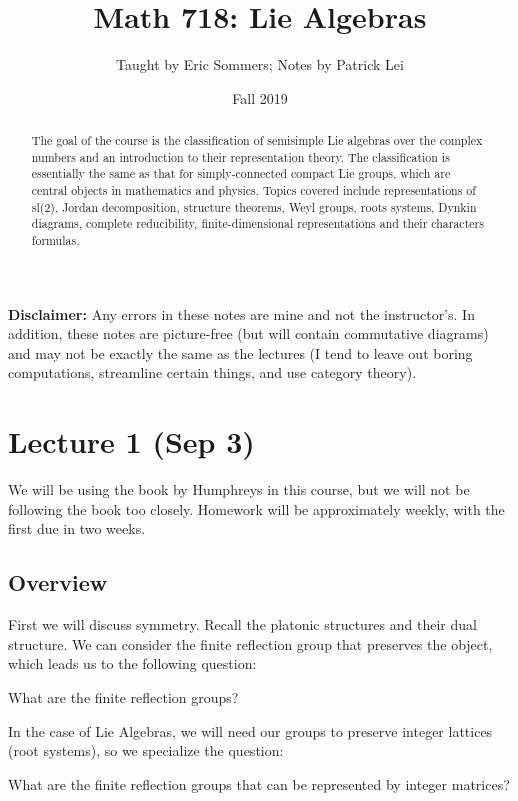 \documentclass[twoside, 10pt]{article}
\title{Math 718: Lie Algebras}
\author{Taught by Eric Sommers; Notes by Patrick Lei}
\affil{University of Massachusetts, Amherst}
\date{Fall 2019}
\begin{document}
    \maketitle\thispagestyle{firstpage}
    
    \begin{abstract}
        The goal of the course is the classification of semisimple Lie algebras over the complex numbers and an introduction to their representation theory. The classification is essentially the same as that for simply-connected compact Lie groups, which are central objects in mathematics and physics. Topics covered include representations of sl(2), Jordan decomposition, structure theorems, Weyl groups, roots systems, Dynkin diagrams, complete reducibility, finite-dimensional representations and their characters formulas.
    \end{abstract}

    \tableofcontents

    \textbf{Disclaimer:} Any errors in these notes are mine and not the instructor's. In addition, these notes are picture-free (but will contain commutative diagrams) and may not be exactly the same as the lectures (I tend to leave out boring computations, streamline certain things, and use category theory).

    \section{Lecture 1 (Sep 3)}%
    \label{sec:lecture_1_sep_3_}


    We will be using the book by Humphreys in this course, but we will not be following the book too closely. Homework will be approximately weekly, with the first due in two weeks.

    \subsection{Overview}%
    \label{sub:overview}
    
    
    First we will discuss symmetry. Recall the platonic structures and their dual structure. We can consider the finite reflection group that preserves the object, which leads us to the following question:

    \begin{quest}
        What are the finite reflection groups?
    \end{quest}
    In the case of Lie Algebras, we will need our groups to preserve integer lattices (root systems), so we specialize the question:
    \begin{quest}
        What are the finite reflection groups that can be represented by integer matrices?
    \end{quest}
\end{document}
